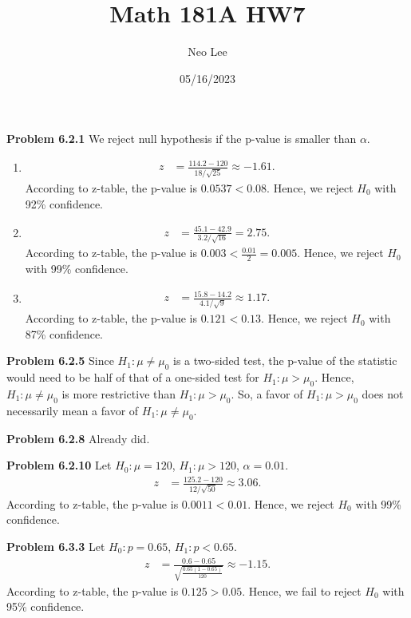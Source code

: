 \documentclass{article}
\title{Math 181A HW7}
\author{Neo Lee}
\date{05/16/2023}
\begin{document}
 

\maketitle 

\textbf{Problem 6.2.1}
We reject null hypothesis if the p-value is smaller than $\alpha$.
\begin{enumerate}[label={(\alph*)}]
    \item \begin{align*}
        z & = \frac{114.2-120}{18/\sqrt{25}} \approx-1.61.
    \end{align*}
    According to z-table, the p-value is $0.0537 < 0.08$. Hence, we reject $H_0$ with 92\% confidence.

    \item
    \begin{align*}
        z & = \frac{45.1-42.9}{3.2/\sqrt{16}} = 2.75.
    \end{align*}
    According to z-table, the p-value is $0.003 < \frac{0.01}{2} = 0.005$. Hence, we reject $H_0$ with 99\% confidence.

    \item
    \begin{align*}
        z & = \frac{15.8-14.2}{4.1/\sqrt{9}} \approx 1.17.
    \end{align*}
    According to z-table, the p-value is $0.121 < 0.13$. Hence, we reject $H_0$ with 87\% confidence.
\end{enumerate}
\bigbreak


\textbf{Problem 6.2.5}
Since $H_1 : \mu \neq \mu_0$ is a two-sided test, the p-value of the statistic would need to be half of that of a one-sided test for $H_1 : \mu > \mu_0$. 
Hence, $H_1 : \mu \neq \mu_0$ is more restrictive than $H_1 : \mu > \mu_0$. So, a favor of $H_1 : \mu > \mu_0$ does not necessarily mean a favor of $H_1 : \mu \neq \mu_0$.
\bigbreak


\textbf{Problem 6.2.8}
Already did.
\bigbreak


\textbf{Problem 6.2.10}
Let $H_0: \mu = 120$, $H_1: \mu > 120$, $\alpha = 0.01$.
\begin{align*}
    z & = \frac{125.2-120}{12/\sqrt{50}} \approx 3.06.
\end{align*}
According to z-table, the p-value is $0.0011 < 0.01$. Hence, we reject $H_0$ with 99\% confidence.
\bigbreak


\textbf{Problem 6.3.3}
Let $H_0: p = 0.65$, $H_1: p < 0.65$.
\begin{align*}
    z & = \frac{0.6-0.65}{\sqrt{\frac{0.65(1-0.65)}{120}}} \approx -1.15.
\end{align*}
According to z-table, the p-value is $0.125 > 0.05$. Hence, we fail to reject $H_0$ with 95\% confidence.
\bigbreak
\end{document}
